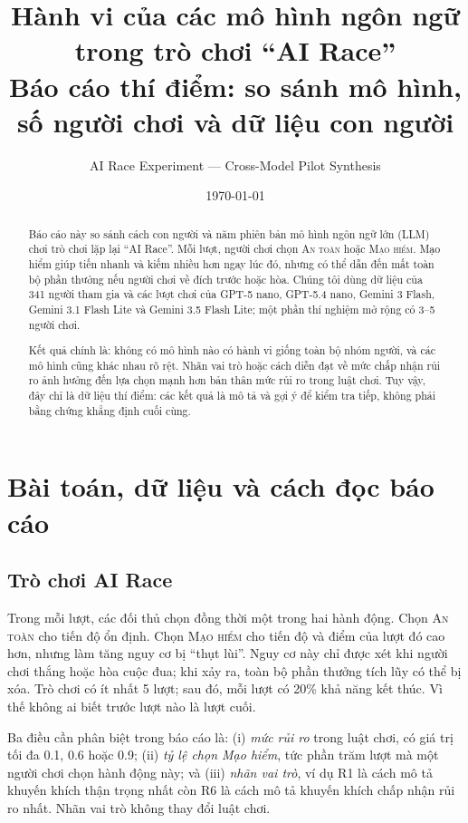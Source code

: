 \documentclass[11pt]{article}
\title{\textbf{Hành vi của các mô hình ngôn ngữ trong trò chơi ``AI Race''}\\[0.3em]
\large Báo cáo thí điểm: so sánh mô hình, số người chơi và dữ liệu con người}
\author{AI Race Experiment --- Cross-Model Pilot Synthesis}
\date{\today}
\begin{document}
\maketitle

\begin{abstract}
Báo cáo này so sánh cách con người và năm phiên bản mô hình ngôn ngữ lớn (LLM)
chơi trò chơi lặp lại ``AI Race''. Mỗi lượt, người chơi chọn \textsc{An toàn}
hoặc \textsc{Mạo hiểm}. Mạo hiểm giúp tiến nhanh và kiếm nhiều hơn ngay lúc đó,
nhưng có thể dẫn đến mất toàn bộ phần thưởng nếu người chơi về đích trước hoặc
hòa. Chúng tôi dùng dữ liệu của 341 người tham gia và các lượt chơi của GPT-5
nano, GPT-5.4 nano, Gemini 3 Flash, Gemini 3.1 Flash Lite và Gemini 3.5 Flash
Lite; một phần thí nghiệm mở rộng có 3--5 người chơi.

Kết quả chính là: không có mô hình nào có hành vi giống toàn bộ nhóm người, và
các mô hình cũng khác nhau rõ rệt. Nhãn vai trò hoặc cách diễn đạt về mức chấp
nhận rủi ro ảnh hưởng đến lựa chọn mạnh hơn bản thân mức rủi ro trong luật chơi.
Tuy vậy, đây chỉ là dữ liệu thí điểm: các kết quả là mô tả và gợi ý để kiểm tra
tiếp, không phải bằng chứng khẳng định cuối cùng.
\end{abstract}

\tableofcontents
\clearpage

\section{Bài toán, dữ liệu và cách đọc báo cáo}

\subsection{Trò chơi AI Race}
Trong mỗi lượt, các đối thủ chọn đồng thời một trong hai hành động. Chọn
\textsc{An toàn} cho tiến độ ổn định. Chọn \textsc{Mạo hiểm} cho tiến độ và
điểm của lượt đó cao hơn, nhưng làm tăng nguy cơ bị ``thụt lùi''. Nguy cơ này
chỉ được xét khi người chơi thắng hoặc hòa cuộc đua; khi xảy ra, toàn bộ phần
thưởng tích lũy có thể bị xóa. Trò chơi có ít nhất 5 lượt; sau đó, mỗi lượt có
20\% khả năng kết thúc. Vì thế không ai biết trước lượt nào là lượt cuối.

Ba điều cần phân biệt trong báo cáo là: (i) \emph{mức rủi ro} trong luật chơi,
có giá trị tối đa 0.1, 0.6 hoặc 0.9; (ii) \emph{tỷ lệ chọn Mạo hiểm}, tức phần
trăm lượt mà một người chơi chọn hành động này; và (iii) \emph{nhãn vai trò},
ví dụ R1 là cách mô tả khuyến khích thận trọng nhất còn R6 là cách mô tả
khuyến khích chấp nhận rủi ro nhất. Nhãn vai trò không thay đổi luật chơi.
\end{document}
